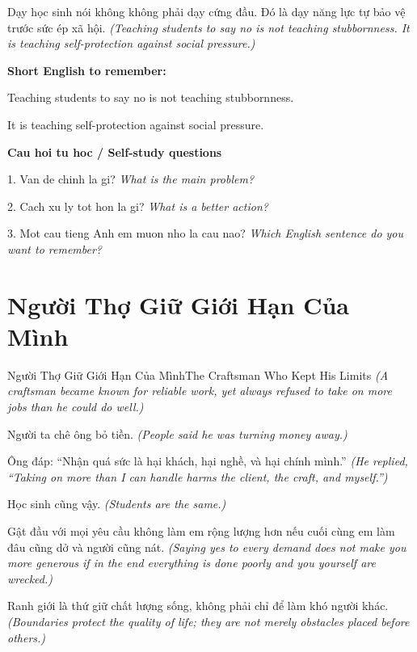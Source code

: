 \begin{baihoc}
Dạy học sinh nói không không phải dạy cứng đầu. Đó là dạy năng lực tự bảo vệ trước sức ép xã hội.
\textit{(Teaching students to say no is not teaching stubbornness. It is teaching self-protection against social pressure.)}
\end{baihoc}

\begin{ghinhoanh}
\textbf{Short English to remember:}

Teaching students to say no is not teaching stubbornness.

It is teaching self-protection against social pressure.

\end{ghinhoanh}

\begin{tuhocnhanh}
\textbf{Cau hoi tu hoc / Self-study questions}

1. Van de chinh la gi? \textit{What is the main problem?}

2. Cach xu ly tot hon la gi? \textit{What is a better action?}

3. Mot cau tieng Anh em muon nho la cau nao? \textit{Which English sentence do you want to remember?}
\end{tuhocnhanh}
\ngancach

\section{Người Thợ Giữ Giới Hạn Của Mình}
\begin{truyen}{Người Thợ Giữ Giới Hạn Của Mình}{The Craftsman Who Kept His Limits}
\textit{(A craftsman became known for reliable work, yet always refused to take on more jobs than he could do well.)}

Người ta chê ông bỏ tiền.
\textit{(People said he was turning money away.)}

Ông đáp: ``Nhận quá sức là hại khách, hại nghề, và hại chính mình.''
\textit{(He replied, ``Taking on more than I can handle harms the client, the craft, and myself.'')}

Học sinh cũng vậy.
\textit{(Students are the same.)}

Gật đầu với mọi yêu cầu không làm em rộng lượng hơn nếu cuối cùng em làm đâu cũng dở và người cũng nát.
\textit{(Saying yes to every demand does not make you more generous if in the end everything is done poorly and you yourself are wrecked.)}

Ranh giới là thứ giữ chất lượng sống, không phải chỉ để làm khó người khác.
\textit{(Boundaries protect the quality of life; they are not merely obstacles placed before others.)}

\end{truyen}

